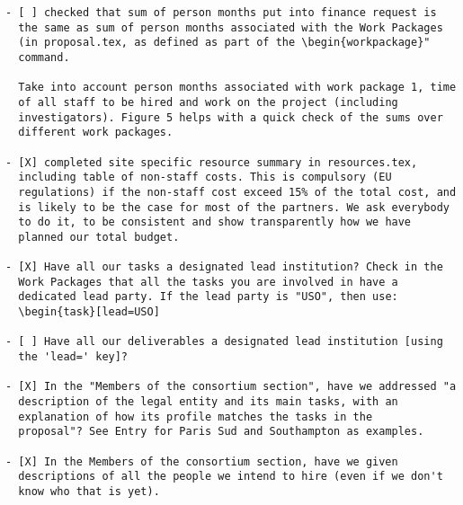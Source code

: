 \begin{draft}
\vspace{1cm}

\begin{verbatim}
- [ ] checked that sum of person months put into finance request is
  the same as sum of person months associated with the Work Packages
  (in proposal.tex, as defined as part of the \begin{workpackage}"
  command.
  
  Take into account person months associated with work package 1, time
  of all staff to be hired and work on the project (including
  investigators). Figure 5 helps with a quick check of the sums over
  different work packages.

- [X] completed site specific resource summary in resources.tex,
  including table of non-staff costs. This is compulsory (EU
  regulations) if the non-staff cost exceed 15% of the total cost, and
  is likely to be the case for most of the partners. We ask everybody
  to do it, to be consistent and show transparently how we have
  planned our total budget.

- [X] Have all our tasks a designated lead institution? Check in the
  Work Packages that all the tasks you are involved in have a
  dedicated lead party. If the lead party is "USO", then use:
  \begin{task}[lead=USO]

- [ ] Have all our deliverables a designated lead institution [using
  the 'lead=' key]?

- [X] In the "Members of the consortium section", have we addressed "a
  description of the legal entity and its main tasks, with an
  explanation of how its profile matches the tasks in the
  proposal"? See Entry for Paris Sud and Southampton as examples.

- [X] In the Members of the consortium section, have we given
  descriptions of all the people we intend to hire (even if we don't
  know who that is yet). 
\end{verbatim}
\end{draft}




